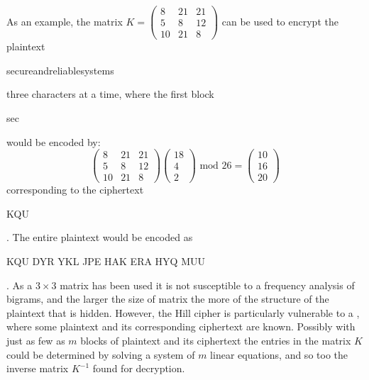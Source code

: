 As an example, the matrix
$K=\left(\begin{array}{ccc}8&21&21\\5&8&12\\10&21&8\end{array}\right)$ can be used to
encrypt the plaintext \begin{code}secureandreliablesystems\end{code} three characters
at a time, where the first block \begin{code}sec\end{code} would be encoded by:
\begin{displaymath}
  \left(\begin{array}{ccc}8&21&21\\5&8&12\\10&21&8\end{array}\right)
  \left(\begin{array}{c}18\\4\\2\end{array}\right)
  \mbox{ mod $26$} =
  \left(\begin{array}{c}10\\16\\20\end{array}\right)
\end{displaymath}
corresponding to the ciphertext \begin{code}KQU\end{code}.
The entire plaintext would be encoded as \begin{code}KQU DYR YKL JPE HAK ERA HYQ MUU\end{code}.
As a $3\times3$ matrix has been used it is not susceptible to a frequency analysis
of bigrams, and the larger the size of matrix the more of the structure of the plaintext
that is hidden. However, the Hill cipher is particularly vulnerable to a
, where some plaintext and its corresponding ciphertext are
known. Possibly with just as few as $m$ blocks of plaintext and its ciphertext the
entries in the matrix $K$ could be determined by solving a system of $m$ linear equations,
and so too the inverse matrix $K^{-1}$ found for decryption.

